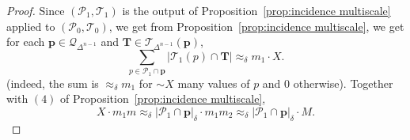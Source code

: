 \documentclass{amsart}
\newcommand{\app}{\approx}
\newcommand{\bp}{\mathbf{p}}
\newcommand{\bT}{\mathbf{T}}
\newcommand{\cD}{\mathcal{D}}
\newcommand{\cT}{\mathcal{T}}
\newcommand{\cQ}{\mathcal{Q}}
\newcommand{\cP}{\mathcal{P}}
\begin{document}
\begin{proof}
Since $(\cP_1, \cT_1)$ is the output of  Proposition~\ref{prop:incidence multiscale} applied to $(\cP_0, \cT_0)$, we get from Proposition~\ref{prop:incidence multiscale}, we get for each $\bp\in \cQ_{\Delta^{n-1}}$ and $\bT\in \cT_{\Delta^{n-1}} (\bp)$, 
    \begin{equation}\label{eqn:m1 X}
        \sum_{p\in \cP_1\cap \bp} | \cT_1(p)\cap \bT| \approx_{\delta} m_1 \cdot X.
    \end{equation}
    (indeed, the sum is $\app_\delta m_1$ for $\sim X$ many values of $p$ and $0$ otherwise).
    Together with $(4)$ of Proposition~\ref{prop:incidence multiscale}, 
    \[
    X \cdot m_1 m \approx_{\delta} |\cP_1\cap \bp|_{\delta} \cdot m_1 m_2\approx_{\delta} |\cP_1\cap \bp|_{\delta} \cdot M.
    \]



\end{proof}
\end{document}
